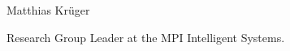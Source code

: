 \begin{participant}[type=R,PM=12,gender=male,salary=5500]{Matthias Krüger}

Research Group Leader at the MPI Intelligent Systems.

\end{participant}
